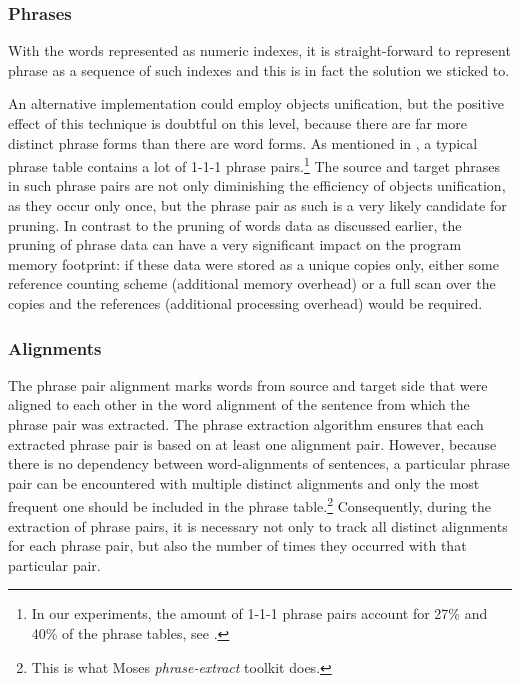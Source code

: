 \subsubsection*{Phrases}

With the words represented as numeric indexes, it is straight-forward to represent phrase as
a sequence of such indexes and this is in fact the solution we sticked to.

An alternative implementation could employ objects unification, but the positive effect
of this technique is doubtful on this level, because there are far more distinct phrase forms
than there are word forms.
As mentioned in , a typical phrase table contains a lot of
1-1-1 phrase pairs.\footnote{In our experiments, the amount of 1-1-1 phrase pairs account for
27\% and 40\% of the phrase tables, see .}
The source and target phrases in such phrase pairs are not only diminishing the efficiency of
objects unification, as they occur only once, but the phrase pair as such is a very likely
candidate for pruning.
In contrast to the pruning of words data as discussed earlier, the pruning of phrase data can
have a very significant impact on the program memory footprint: if these data were stored as
a unique copies only, either some reference counting scheme (additional memory overhead) or
a full scan over the copies and the references (additional processing overhead) would be required.

\subsubsection*{Alignments}

The phrase pair alignment marks words from source and target side that were aligned to
each other in the word alignment of the sentence from which the phrase pair was extracted.
The phrase extraction algorithm ensures that each extracted phrase pair is based on
at least one alignment pair.
However, because there is no dependency between word-alignments of sentences,
a particular phrase pair can be encountered with multiple distinct alignments and only
the most frequent one should be included in the phrase table.\footnote{This is what Moses \emph{phrase-extract} toolkit does.}
Consequently, during the extraction of phrase pairs, it is necessary not only to track all
distinct alignments for each phrase pair, but also the number of times they occurred with
that particular pair.

